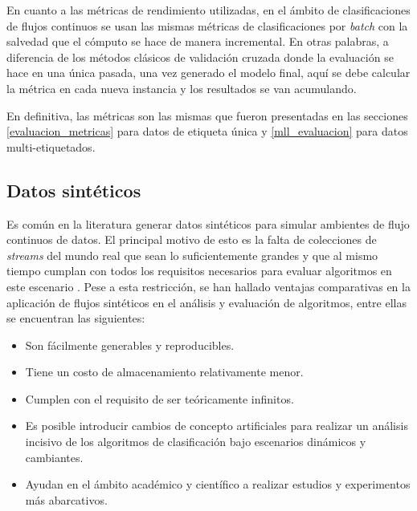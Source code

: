 En cuanto a las métricas de rendimiento utilizadas, en el ámbito de
clasificaciones de flujos continuos se usan las mismas métricas de
clasificaciones por \textit{batch} con la salvedad que el cómputo se hace de
manera incremental. En otras palabras, a diferencia de los métodos clásicos de
validación cruzada donde la evaluación se hace en una única pasada, una vez
generado el modelo final, aquí se debe calcular la métrica en cada nueva
instancia y los resultados se van acumulando.

En definitiva, las métricas son las mismas que fueron presentadas en las
secciones \ref{evaluacion_metricas} para datos de etiqueta única y
\ref{mll_evaluacion} para datos multi-etiquetados.

\subsection{Datos sintéticos}

Es común en la literatura generar datos sintéticos para simular ambientes de
flujo continuos de datos. El principal motivo de esto es la falta de colecciones
de \textit{streams} del mundo real que sean lo suficientemente grandes y que al
mismo tiempo cumplan con todos los requisitos necesarios para evaluar algoritmos
en este escenario \cite{kirkby_improving_2007}. Pese a esta restricción, se han
hallado ventajas comparativas en la aplicación de flujos sintéticos en el
análisis y evaluación de algoritmos, entre ellas se encuentran las siguientes:

\begin{itemize} 

   \item Son fácilmente generables y reproducibles.

   \item Tiene un costo de almacenamiento relativamente menor.

   \item Cumplen con el requisito de ser teóricamente infinitos.

   \item Es posible introducir cambios de concepto artificiales para realizar un
      análisis incisivo de los algoritmos de clasificación bajo escenarios
      dinámicos y cambiantes.

   \item Ayudan en el ámbito académico y científico a realizar estudios y
      experimentos más abarcativos.

\end{itemize} 

